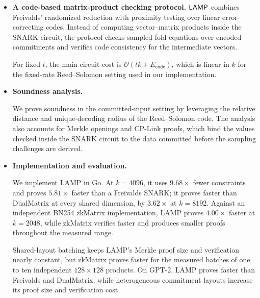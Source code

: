 \begin{itemize}
  \item \textbf{A code-based matrix-product checking protocol.}
  \(\textsf{LAMP}\) combines Freivalds' randomized reduction with proximity testing
  over linear error-correcting codes.  Instead of computing vector--matrix
  products inside the SNARK circuit, the protocol checks sampled fold equations
  over encoded commitments and verifies code consistency for the intermediate
  vectors. 

  For fixed \(t\), the main circuit cost is
  \(\mathcal{O}(tk+E_{\mathsf{code}})\), which is linear in \(k\) for the
  fixed-rate Reed--Solomon setting used in our implementation.

  \item \textbf{Soundness analysis.}
  \begin{revblock}
  We prove soundness in the committed-input setting by leveraging the relative
  distance and unique-decoding radius of the Reed--Solomon code.  The analysis
  also accounts for Merkle openings and CP-Link proofs, which bind the values
  checked inside the SNARK circuit to the data committed before the sampling
  challenges are derived.
  \end{revblock}

  \item \textbf{Implementation and evaluation.}
  \begin{revblock}
  We implement LAMP in Go. At \(k=4096\), it uses \(9.68\times\) fewer
  constraints and proves \(5.81\times\) faster than a Freivalds SNARK; it
  proves faster than DualMatrix at every shared dimension, by \(3.62\times\)
  at \(k=8192\). Against an independent BN254 zkMatrix implementation, LAMP
  proves \(4.00\times\) faster at \(k=2048\), while zkMatrix verifies faster
  and produces smaller proofs throughout the measured range.

  Shared-layout batching keeps LAMP's Merkle proof size and verification
  nearly constant, but zkMatrix proves faster for the measured batches of
  one to ten independent \(128\times128\) products. On GPT-2, LAMP proves
  faster than Freivalds and DualMatrix, while heterogeneous commitment
  layouts increase its proof size and verification cost.
  \end{revblock}
\end{itemize}

